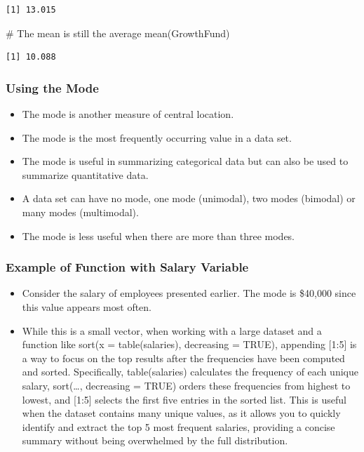 \documentclass[
  letterpaper,
  DIV=11,
  numbers=noendperiod]{scrreprt}
\newenvironment{Shaded}{\begin{snugshade}}{\end{snugshade}}
\newcommand{\CommentTok}[1]{\textcolor[rgb]{0.37,0.37,0.37}{#1}}
\newcommand{\FunctionTok}[1]{\textcolor[rgb]{0.28,0.35,0.67}{#1}}
\newcommand{\NormalTok}[1]{\textcolor[rgb]{0.00,0.23,0.31}{#1}}
\providecommand{\tightlist}{%
  \setlength{\itemsep}{0pt}\setlength{\parskip}{0pt}}\usepackage{longtable,booktabs,array}
\begin{document}
\begin{verbatim}
[1] 13.015
\end{verbatim}

\begin{Shaded}
\begin{Highlighting}[]
\CommentTok{\# The mean is still the average}
\FunctionTok{mean}\NormalTok{(GrowthFund)}
\end{Highlighting}
\end{Shaded}

\begin{verbatim}
[1] 10.088
\end{verbatim}

\subsubsection{Using the Mode}\label{using-the-mode}

\begin{itemize}
\tightlist
\item
  The mode is another measure of central location.
\item
  The mode is the most frequently occurring value in a data set.
\item
  The mode is useful in summarizing categorical data but can also be
  used to summarize quantitative data.
\item
  A data set can have no mode, one mode (unimodal), two modes (bimodal)
  or many modes (multimodal).
\item
  The mode is less useful when there are more than three modes.
\end{itemize}

\subsubsection{Example of Function with Salary
Variable}\label{example-of-function-with-salary-variable}

\begin{itemize}
\tightlist
\item
  Consider the salary of employees presented earlier. The mode is
  \$40,000 since this value appears most often.
\item
  While this is a small vector, when working with a large dataset and a
  function like sort(x = table(salaries), decreasing = TRUE), appending
  {[}1:5{]} is a way to focus on the top results after the frequencies
  have been computed and sorted. Specifically, table(salaries)
  calculates the frequency of each unique salary, sort(\ldots,
  decreasing = TRUE) orders these frequencies from highest to lowest,
  and {[}1:5{]} selects the first five entries in the sorted list. This
  is useful when the dataset contains many unique values, as it allows
  you to quickly identify and extract the top 5 most frequent salaries,
  providing a concise summary without being overwhelmed by the full
  distribution.
\end{itemize}
\end{document}
